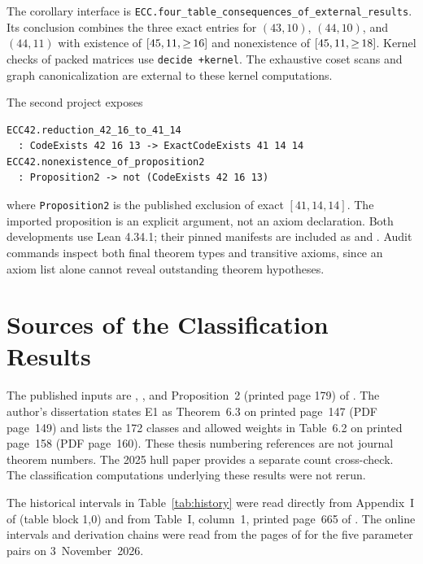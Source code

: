 The corollary interface is \texttt{ECC.four\_table\_consequences\_of\_external\_results}. Its conclusion combines the three exact entries for $(43,10)$, $(44,10)$, and $(44,11)$ with existence of $\mbox{\ensuremath{[45,11,{\ge}\,16]}}$ and nonexistence of $\mbox{\ensuremath{[45,11,{\ge}\,18]}}$. Kernel checks of packed matrices use \texttt{decide +kernel}. The exhaustive coset scans and graph canonicalization are external to these kernel computations.

The second project exposes
\begin{lstlisting}[basicstyle=\ttfamily\small,breaklines=true]
ECC42.reduction_42_16_to_41_14
  : CodeExists 42 16 13 -> ExactCodeExists 41 14 14
ECC42.nonexistence_of_proposition2
  : Proposition2 -> not (CodeExists 42 16 13)
\end{lstlisting}
where \texttt{Proposition2} is the published exclusion of exact $[41,14,14]$. The imported proposition is an explicit argument, not an axiom declaration. Both developments use Lean 4.34.1; their pinned manifests are included as  and . Audit commands inspect both final theorem types and transitive axioms, since an axiom list alone cannot reveal outstanding theorem hypotheses.

\section{Sources of the Classification Results}\label{app:sources}
The published inputs are \citet{bouyukliev2000}, \citet{bouyukliev2001}, and Proposition~2 (printed page 179) of \citet{bouyuklieva2020}. The author's dissertation \citep{bouyukliev2008thesis} states E1 as Theorem~6.3 on printed page~147 (PDF page~149) and lists the 172 classes and allowed weights in Table~6.2 on printed page~158 (PDF page~160). These thesis numbering references are not journal theorem numbers. The 2025 hull paper \citep{bouyuklieva2025} provides a separate count cross-check. The classification computations underlying these results were not rerun.

The historical intervals in Table~\ref{tab:history} were read directly from Appendix~I of \citet{verhoeff1985} (table block 1,0) and from Table~I, column~1, printed page~665 of \citet{brouwer1993}. The online intervals and derivation chains were read from the pages of \citet{grasslTables} for the five parameter pairs on 3~November~2026.
